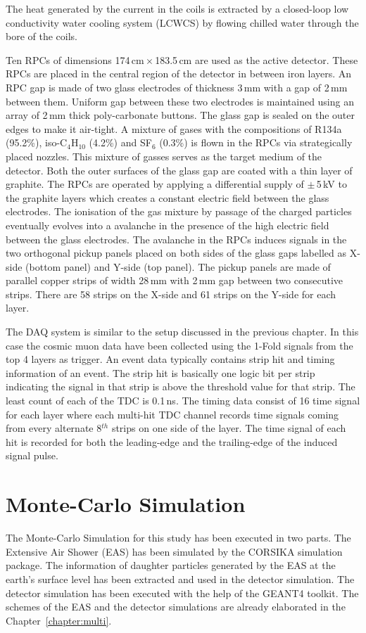 The heat generated by the current in the
coils is extracted by a closed-loop low conductivity water cooling
system (LCWCS) by flowing chilled water through the bore of the coils.

Ten RPCs of dimensions 174\,cm\,$\times$\,183.5\,cm are used as the
active detector. These RPCs are placed in the central region of
the detector in between iron layers.
An RPC gap is made of two glass electrodes of thickness 3\,mm with
a gap of 2\,mm between them. Uniform gap between these two electrodes
is maintained using an array of 2\,mm thick poly-carbonate buttons.
The glass gap is sealed on the outer edges to make it air-tight.
A mixture of gases with the compositions of R134a (95.2\%),
iso-C$_4$H$_{10}$ (4.2\%) and SF$_6$ (0.3\%) is flown in the RPCs
via strategically placed nozzles. This mixture of gasses serves as the
target medium of the detector.
Both the outer surfaces of the glass gap are coated with a thin layer
of graphite. The RPCs are operated by applying a differential supply of
$\pm$\,5\,kV to the graphite layers which creates a constant electric
field between the glass electrodes. The ionisation of the gas mixture
by passage of the charged particles eventually evolves into a
avalanche in the presence of the high electric field between the glass
electrodes. The avalanche in the RPCs induces signals in the two
orthogonal pickup panels placed on both sides of the glass gaps
labelled as X-side (bottom panel) and Y-side (top panel). The pickup panels
  are made of parallel
copper strips of width 28\,mm with 2\,mm gap between two consecutive
strips. There are 58 strips on the X-side and 61 strips on the %
Y-side for each layer.

The DAQ system is similar to the setup discussed in the previous
chapter. In this case the cosmic muon data have been collected using
the 1-Fold signals from the top 4 layers as trigger.
An event data typically contains strip hit and timing information
of an event. The strip hit is basically one logic bit per strip
indicating the signal in that strip is above the threshold value
for that strip. The least count of each of the TDC is 0.1\,ns.
The timing data consist of 16 time signal for
each layer where each multi-hit TDC channel records time signals
coming from every alternate 8$^{th}$ strips on one side of the layer.
The time signal of each hit is recorded for both the leading-edge and
the trailing-edge of the induced signal pulse.

\section{Monte-Carlo Simulation}
The Monte-Carlo Simulation for this study has been executed in
two parts. The Extensive Air Shower (EAS) has been simulated
by the CORSIKA simulation package\cite{corsika763}. The information
of daughter particles generated by the EAS at the earth's surface
level has been extracted and used in the detector simulation.
The detector simulation has been executed with the help
of the GEANT4 toolkit\cite{geant4}. The schemes of the EAS and the
detector simulations are already elaborated in the
Chapter~\ref{chapter:multi}.

